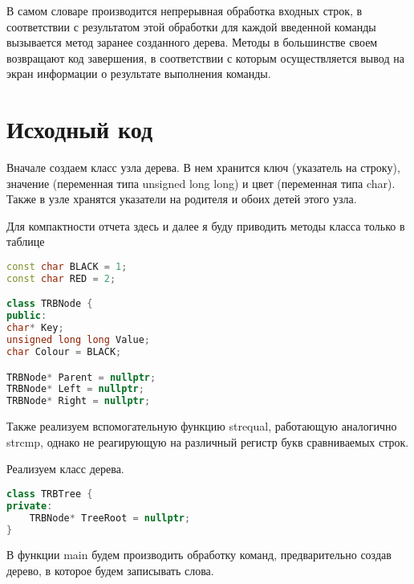 В самом словаре производится непрерывная обработка входных строк, в соответствии с результатом этой обработки для каждой введенной команды вызывается
метод заранее созданного дерева. Методы в большинстве своем возвращают код завершения, в соответствии с которым осуществляется вывод на экран информации о
результате выполнения команды.

\pagebreak

\section{Исходный код}
Вначале создаем класс узла дерева. В нем хранится ключ (указатель на строку),
значение (переменная типа unsigned long long) и цвет (переменная типа char). Также
в узле хранятся указатели на родителя и обоих детей этого узла.

Для компактности отчета здесь и далее я буду приводить методы класса только в таблице

\begin{lstlisting}[language=C++]
const char BLACK = 1;
const char RED = 2;

class TRBNode {
public: 
char* Key; 
unsigned long long Value;
char Colour = BLACK;

TRBNode* Parent = nullptr;
TRBNode* Left = nullptr;
TRBNode* Right = nullptr;
\end{lstlisting}

Также реализуем вспомогательную функцию strequal, работающую аналогично strcmp,
однако не реагирующую на различный регистр букв сравниваемых строк.

Реализуем класс дерева.
\begin{lstlisting}[language=C++]
class TRBTree {
private:
	TRBNode* TreeRoot = nullptr;
}
\end{lstlisting}

В функции main будем производить обработку команд, предварительно создав дерево, в которое будем записывать слова.

